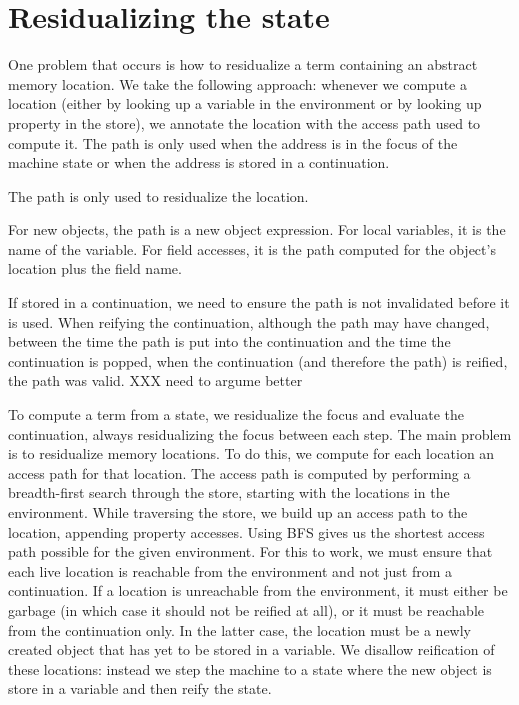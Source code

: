 \section{Residualizing the state}

One problem that occurs is how to residualize a term
containing an abstract memory location.
We take the following approach:
whenever we compute a location
(either by looking up a variable
in the environment or by looking up property in the store),
we annotate the location with the access path used to compute it.
The path is only used when the address is in the focus
of the machine state or when the address is stored in a continuation.

The path is only used to residualize the location.

For new objects, the path is a new object expression.
For local variables, it is the name of the variable.
For field accesses, it is the path computed for the object's location
plus the field name.

If stored in a continuation, 
we need to ensure the path is not invalidated
before it is used.
When reifying the continuation, although the 
path may have changed, between the time the path is put into the
continuation and the time the continuation is popped,
when the continuation (and therefore the path) is reified,
the path was valid.
        XXX need to argume better


To compute a term from a state, we residualize the focus
and evaluate the continuation, always residualizing the focus
between each step.
The main problem is to residualize memory locations.
To do this, we compute for each location an access path for that 
location. The access path is computed by performing a breadth-first search through the store, starting with the locations in the environment.
While traversing the store, we build up an access path to the location, appending property accesses.
Using BFS gives us the shortest access path possible for the given
environment.
For this to work, we must ensure that each live location is reachable 
from the environment and not just from a continuation.
If a location is unreachable from the environment, it must either be garbage (in which case it should not be reified at all), or it must be reachable from
the continuation only.
In the latter case, the location must be a newly created object
that has yet to be stored in a variable.
We disallow reification of these locations: instead we step the
machine to a state where the new object is store in a variable
and then reify the state.

